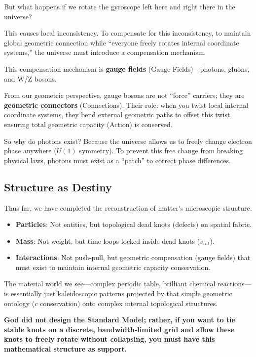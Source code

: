 But what happens if we rotate the gyroscope left here and right there in the universe?

This causes local inconsistency. To compensate for this inconsistency, to maintain global geometric connection while ``everyone freely rotates internal coordinate systems,'' the universe must introduce a compensation mechanism.

This compensation mechanism is \textbf{gauge fields} (Gauge Fields)---photons, gluons, and W/Z bosons.

From our geometric perspective, gauge bosons are not ``force'' carriers; they are \textbf{geometric connectors} (Connections). Their role: when you twist local internal coordinate systems, they bend external geometric paths to offset this twist, ensuring total geometric capacity (Action) is conserved.

So why do photons exist? Because the universe allows us to freely change electron phase anywhere ($U(1)$ symmetry). To prevent this free change from breaking physical laws, photons must exist as a ``patch'' to correct phase differences.

\subsection{Structure as Destiny}

Thus far, we have completed the reconstruction of matter's microscopic structure.

\begin{itemize}
\item \textbf{Particles}: Not entities, but topological dead knots (defects) on spatial fabric.

\item \textbf{Mass}: Not weight, but time loops locked inside dead knots ($v_{int}$).

\item \textbf{Interactions}: Not push-pull, but geometric compensation (gauge fields) that must exist to maintain internal geometric capacity conservation.
\end{itemize}

The material world we see---complex periodic table, brilliant chemical reactions---is essentially just kaleidoscopic patterns projected by that simple geometric ontology ($c$ conservation) onto complex internal topological structures.

\textbf{God did not design the Standard Model; rather, if you want to tie stable knots on a discrete, bandwidth-limited grid and allow these knots to freely rotate without collapsing, you must have this mathematical structure as support.}

